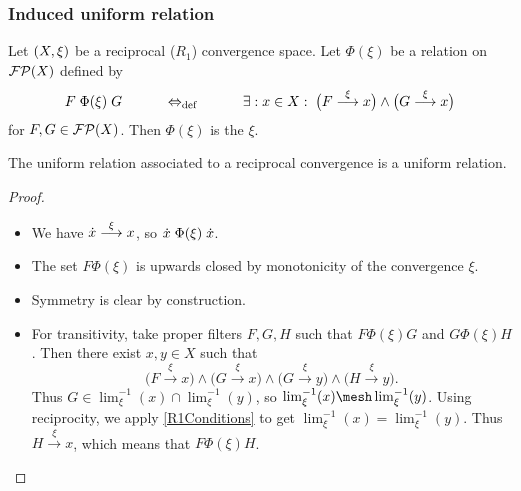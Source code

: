 \subsubsection{Induced uniform relation}
\begin{definition}
Let $\sSet{X,\xi}$ be a reciprocal ($R_1$) convergence space. Let $\Phi(\xi)$ be a relation on $\operatorname{\mathcal{FP}}(X)$ defined by
\[ F\mathrel{\Phi(\xi)}G \qquad\quad\Leftrightarrow_{\text{def}}\quad\qquad \exists: x\in X: \; \big(F\overset{\xi}{\longrightarrow} x\big) \land \big(G\overset{\xi}{\longrightarrow} x\big) \]
for $F,G\in\operatorname{\mathcal{FP}}(X)$.
Then $\Phi(\xi)$ is the  $\xi$.
\end{definition}

\begin{lemma} \label{uniformRelationAssociatedToR1Convergence}
The uniform relation associated to a reciprocal convergence is a uniform relation.
\end{lemma}
\begin{proof}
\begin{itemize}
\item We have $\dot{x}\overset{\xi}{\longrightarrow} x$, so $\dot{x}\mathrel{\Phi(\xi)}\dot{x}$.
\item The set $F\mathrel{\Phi(\xi)}$ is upwards closed by monotonicity of the convergence $\xi$.
\item Symmetry is clear by construction.
\item For transitivity, take proper filters $F,G,H$ such that $F\mathrel{\Phi(\xi)}G$ and $G\mathrel{\Phi(\xi)}H$. Then there exist $x,y\in X$ such that
\[ \big(F\overset{\xi}{\longrightarrow} x\big) \land \big(G\overset{\xi}{\longrightarrow} x\big) \land \big(G\overset{\xi}{\longrightarrow} y\big) \land \big(H\overset{\xi}{\longrightarrow} y\big). \]
Thus $G\in \lim^{-1}_\xi(x) \cap\lim^{-1}_\xi(y)$, so $\lim^{-1}_\xi(x) \mesh\lim^{-1}_\xi(y)$. Using reciprocity, we apply \ref{R1Conditions} to get $\lim^{-1}_\xi(x) = \lim^{-1}_\xi(y)$. Thus $H \overset{\xi}{\longrightarrow} x$, which means that $F\mathrel{\Phi(\xi)}H$.
\end{itemize}
\end{proof}


